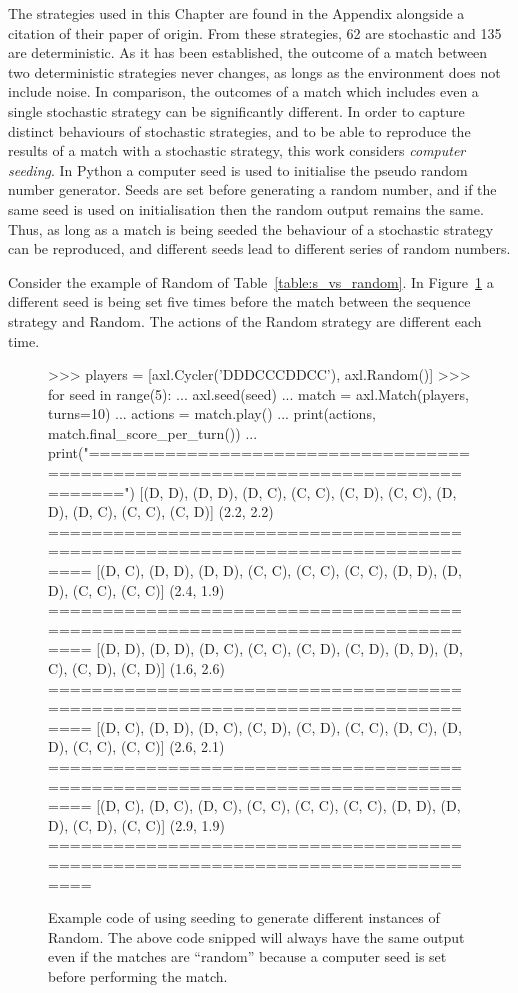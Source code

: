 The \numberofstrategiesbestsequences strategies used in this Chapter are found
in the Appendix alongside a citation of their paper of origin.
From these \numberofstrategiesbestsequences strategies, 62 are stochastic and
135 are deterministic. As it has been established, the outcome of a match
between two deterministic strategies never changes, as longs as the environment
does not include noise. In comparison, the outcomes of a match which includes even a single
stochastic strategy can be significantly different. In order to
capture distinct behaviours of stochastic strategies, and to be able to
reproduce the results of a match with a stochastic strategy, this work considers
\textit{computer seeding}. In Python a computer seed is used to initialise the
pseudo random number generator. Seeds are set before generating a random number,
and if the same seed is used on initialisation then the random output remains
the same. Thus, as long as a match is being seeded the behaviour of a stochastic
strategy can be reproduced, and different seeds lead to different series of
random numbers.

Consider the example of Random of Table~\ref{table:s_vs_random}. In
Figure~\ref{fig:random_apl_example} a different seed is being set five times
before the match between the sequence strategy and Random. The actions of the
Random strategy are different each time.

\begin{figure}[!htbp]
    \begin{usagepy}
>>> players = [axl.Cycler('DDDCCCDDCC'), axl.Random()]
>>> for seed in range(5):
...   axl.seed(seed)
...   match = axl.Match(players, turns=10)
...   actions = match.play()
...   print(actions, match.final_score_per_turn())
...   print("================================================================================")
[(D, D), (D, D), (D, C), (C, C), (C, D), (C, C), (D, D), (D, C), (C, C), (C, D)] (2.2, 2.2)
================================================================================
[(D, C), (D, D), (D, D), (C, C), (C, C), (C, C), (D, D), (D, D), (C, C), (C, C)] (2.4, 1.9)
================================================================================
[(D, D), (D, D), (D, C), (C, C), (C, D), (C, D), (D, D), (D, C), (C, D), (C, D)] (1.6, 2.6)
================================================================================
[(D, C), (D, D), (D, C), (C, D), (C, D), (C, C), (D, C), (D, D), (C, C), (C, C)] (2.6, 2.1)
================================================================================
[(D, C), (D, C), (D, C), (C, C), (C, C), (C, C), (D, D), (D, D), (C, D), (C, C)] (2.9, 1.9)
================================================================================

\end{usagepy}
\caption{Example code of using seeding to generate different instances of Random.
The above code snipped will always have the same output even if the matches are
``random'' because a computer seed is set before performing the
match.}\label{fig:random_apl_example}
\end{figure}

